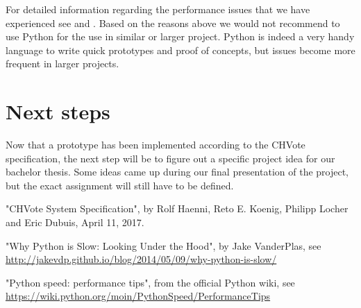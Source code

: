 \documentclass[a4paper,12pt]{report}
\begin{document}
For detailed information regarding the performance issues that we have experienced see \cite{slowpy} and \cite{slowpy2}. Based on the reasons above we would not recommend to use Python for the use in similar or larger project. Python is indeed a very handy language to write quick prototypes and proof of concepts, but issues become more frequent in larger projects.

\section{Next steps}

Now that a prototype has been implemented according to the CHVote specification, the next step will be to figure out a specific project idea for our bachelor thesis. Some ideas came up during our final presentation of the project, but the exact assignment will still have to be defined.

\begin{thebibliography}{999}
	"CHVote System Specification", by Rolf Haenni, Reto E. Koenig, Philipp Locher and Eric Dubuis, April 11, 2017.

	"Why Python is Slow: Looking Under the Hood", by Jake VanderPlas, see \url{http://jakevdp.github.io/blog/2014/05/09/why-python-is-slow/}

	"Python speed: performance tips", from the official Python wiki, see \url{https://wiki.python.org/moin/PythonSpeed/PerformanceTips}
\end{thebibliography}
\end{document}
